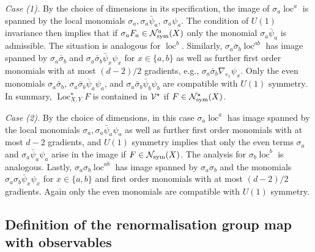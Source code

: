 \documentclass[11pt]{amsart}
\numberwithin{equation}{section}
\numberwithin{theorem}{section}
\newcommand{\1}{{\bf 1}}
\newcommand{\obs}{\star}
\newcommand{\Loc}{\operatorname{Loc}}
\newcommand{\loc}{\operatorname{loc}}
\begin{document}
\smallskip
\noindent\emph{Case (1).}
By the choice of dimensions in its specification, the image of
$\sigma_{a}\loc^{a}$ is spanned by the local monomials
$\sigma_{a}, \sigma_{a}\bar\psi_{a}$, $\sigma_a\psi_{a}$.  The
condition of $U(1)$ invariance then implies that if
$\sigma_a F_a\in \mathcal N^{a}_{\rm sym}(X)$ only the monomial
$\sigma_{a}\bar\psi_{a}$ is admissible.  The situation is analogous
for $\loc^b$.  Similarly,
$\sigma_{a}\bar\sigma_{b}\loc^{ab}$ 
has image spanned by 
$\sigma_{a}\bar\sigma_{b}$ and
$\sigma_{a}\bar\sigma_{b}\bar\psi_x\psi_x$ for $x\in \{a,b\}$ 
as well as further first order monomials with at most $(d-2)/2$
gradients, e.g., $\sigma_a\bar\sigma_b\nabla_{e_{1}}\psi_x$. Only
the even monomials $\sigma_{a}\bar\sigma_{b}$,
$\sigma_{a}\bar\sigma_{b}\bar \psi_{a}\psi_{a}$, and $\sigma_{a}\bar\sigma_{b}\bar\psi_{b}\psi_{b}$
are compatible with $U(1)$ symmetry.
In summary, $\Loc^\obs_{X,Y} F$ is contained in $\cV^\obs$ if $F\in
\cN^{\obs}_{\rm sym}(X)$. 

\smallskip
\noindent\emph{Case (2).}
By the choice of dimensions, in this case
$\sigma_{a}\loc^a$ has image spanned by the local monomials
$\sigma_{a},\sigma_{a}\bar\psi_a\psi_a$ 
as well as further first order monomials
with at most $d-2$ gradients,
and $U(1)$ symmetry implies that only the even terms $\sigma_{a}$ and
$\sigma_{a}\bar\psi_a\psi_a$ 
arise in the image if $F \in \mathcal N_{\rm sym}(X)$. The analysis for
$\sigma_{b}\loc^b$ is analogous. Lastly, $\sigma_{a}\sigma_{b}\loc^{ab}$
has image spanned by $\sigma_{a}\sigma_{b}$ and the monomials
$\sigma_{a}\sigma_{b}\bar\psi_x\psi_x$ for $x\in\{a,b\}$ 
and first order monomials with at most $(d-2)/2$ gradients.
Again only the even monomials are compatible with $U(1)$ symmetry.

\subsection{Definition of the renormalisation group map with observables}
\label{sec:rgmap-ext}
\end{document}
